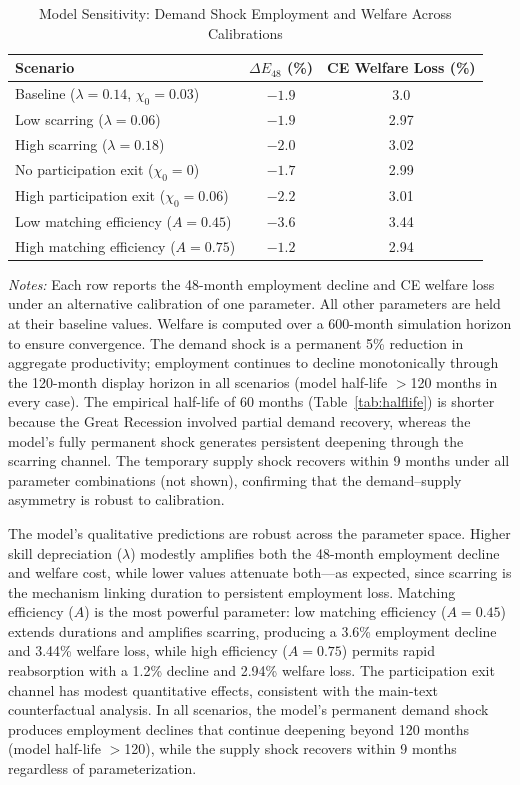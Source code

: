 \documentclass[12pt]{article}
\begin{document}
\begin{table}[H]
\centering
\caption{Model Sensitivity: Demand Shock Employment and Welfare Across Calibrations}
\label{tab:app_model_sensitivity}
\begin{threeparttable}
\small
\begin{tabular}{lcc}
\toprule
Scenario & $\Delta E_{48}$ (\%) & CE Welfare Loss (\%) \\
\midrule
Baseline ($\lambda = 0.14$, $\chi_0 = 0.03$) & $-1.9$ & 3.0 \\
Low scarring ($\lambda = 0.06$) & $-1.9$ & 2.97 \\
High scarring ($\lambda = 0.18$) & $-2.0$ & 3.02 \\
No participation exit ($\chi_0 = 0$) & $-1.7$ & 2.99 \\
High participation exit ($\chi_0 = 0.06$) & $-2.2$ & 3.01 \\
Low matching efficiency ($A = 0.45$) & $-3.6$ & 3.44 \\
High matching efficiency ($A = 0.75$) & $-1.2$ & 2.94 \\
\bottomrule
\end{tabular}
\begin{tablenotes}[flushleft]
\small
\item \textit{Notes:} Each row reports the 48-month employment decline and CE welfare loss under an alternative calibration of one parameter. All other parameters are held at their baseline values. Welfare is computed over a 600-month simulation horizon to ensure convergence. The demand shock is a permanent 5\% reduction in aggregate productivity; employment continues to decline monotonically through the 120-month display horizon in all scenarios (model half-life $>$120 months in every case). The empirical half-life of 60 months (Table~\ref{tab:halflife}) is shorter because the Great Recession involved partial demand recovery, whereas the model's fully permanent shock generates persistent deepening through the scarring channel. The temporary supply shock recovers within 9 months under all parameter combinations (not shown), confirming that the demand--supply asymmetry is robust to calibration.
\end{tablenotes}
\end{threeparttable}
\end{table}

The model's qualitative predictions are robust across the parameter space. Higher skill depreciation ($\lambda$) modestly amplifies both the 48-month employment decline and welfare cost, while lower values attenuate both---as expected, since scarring is the mechanism linking duration to persistent employment loss. Matching efficiency ($A$) is the most powerful parameter: low matching efficiency ($A = 0.45$) extends durations and amplifies scarring, producing a 3.6\% employment decline and 3.44\% welfare loss, while high efficiency ($A = 0.75$) permits rapid reabsorption with a 1.2\% decline and 2.94\% welfare loss. The participation exit channel has modest quantitative effects, consistent with the main-text counterfactual analysis. In all scenarios, the model's permanent demand shock produces employment declines that continue deepening beyond 120 months (model half-life $>$120), while the supply shock recovers within 9 months regardless of parameterization.
\end{document}
